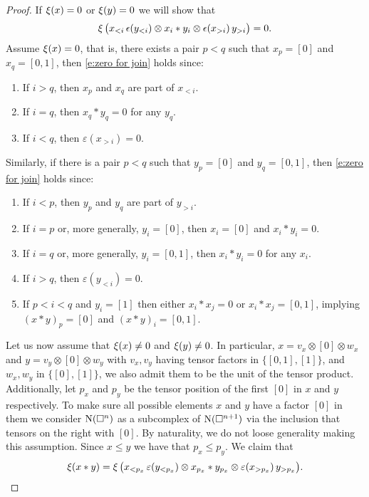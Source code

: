 \begin{proof}
	If $\operatorname{\xi}(x) = 0$ or $\operatorname{\xi}(y) = 0$ we will show that
	\begin{equation} \label{e:zero for join}
	\operatorname{\xi} \big( x_{<i}\, \epsilon(y_{<i}) \otimes x_i \ast y_i \otimes \epsilon(x_{>i}) \, y_{>i} \big) = 0.
	\end{equation}
	Assume $\operatorname{\xi}(x) = 0$, that is, there exists a pair $p < q$ such that $x_p = [0]$ and $x_q = [0,1]$, then \eqref{e:zero for join} holds since:
	\begin{enumerate}
		\item If $i > q$, then $x_p$ and $x_q$ are part of $x_{<i}$.
		\item If $i = q$, then $x_q \ast y_q = 0$ for any $y_q$.
		\item If $i < q$, then $\varepsilon(x_{>i}) = 0$.
	\end{enumerate}
	Similarly, if there is a pair $p < q$ such that $y_p = [0]$ and $y_q = [0,1]$,  then \eqref{e:zero for join} holds since:
	\begin{enumerate}
		\item If $i < p$, then $y_p$ and $y_q$ are part of $y_{>i}$.
		\item If $i = p$ or, more generally, $y_i = [0]$, then $x_i = [0]$ and $x_i \ast y_i = 0$.
		\item If $i = q$ or, more generally, $y_i = [0,1]$, then $x_i \ast y_i = 0$ for any $x_i$.
		\item If $i > q$, then $\varepsilon(y_{<i}) = 0$.
		\item If $p < i < q$ and $y_i = [1]$ then either $x_i \ast x_j = 0$ or $x_i \ast x_j = [0,1]$, implying $(x \ast y)_p = [0]$ and $(x \ast y)_i = [0,1]$.
	\end{enumerate}
	Let us now assume that $\operatorname{\xi}(x) \neq 0$ and $\operatorname{\xi}(y) \neq 0$.
	In particular, $x = v_x \otimes [0] \otimes w_x$ and $y = v_y \otimes [0] \otimes w_y$ with $v_x, v_y$ having tensor factors in $\{[0,1], [1]\}$, and $w_x, w_y$ in $\{[0], [1]\}$, we also admit them to be the unit of the tensor product.
	Additionally, let $p_x$ and $p_y$ be the tensor position of the first $[0]$ in $x$ and $y$ respectively.
	To make sure all possible elements $x$ and $y$ have a factor $[0]$ in them we consider $\operatorname{N}(\square^n)$ as a subcomplex of $\operatorname{N}(\square^{n+1})$ via the inclusion that tensors on the right with $[0]$.
	By naturality, we do not loose generality making this assumption.
	Since $x \leq y$ we have that $p_x \leq p_y$.
	We claim that
	\[
	\operatorname{\xi}(x \ast y) = \operatorname{\xi} \big( x_{<p_x} \, \varepsilon(y_{<p_x}) \otimes x_{p_x} \ast y_{p_x} \otimes \varepsilon(x_{>p_x}) \, y_{>p_x} \big).
\]
\end{proof}
